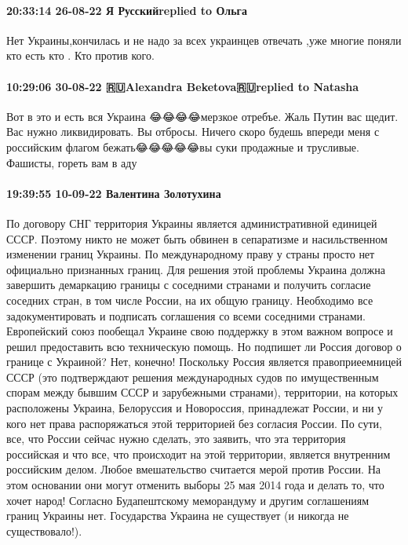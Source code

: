 \paragraph{20:33:14 26-08-22 Я Русскийreplied to Ольга}

Нет Украины,кончилась и не надо за всех украинцев отвечать ,уже многие поняли
кто есть кто . Кто против кого.

\paragraph{10:29:06 30-08-22 🇷🇺Alexandra Beketova🇷🇺replied to Natasha}

Вот в это и есть вся Украина 😂😂😂😂мерзкое отребъе. Жаль Путин вас щедит. Вас
нужно ликвидировать. Вы отбросы. Ничего скоро будешь впереди меня с российским
флагом бежать😂😂😂😂😂вы суки продажные и трусливые. Фашисты, гореть вам в аду


\paragraph{19:39:55 10-09-22 Валентина Золотухина}

По договору СНГ территория Украины является административной единицей СССР. Поэтому никто не может быть обвинен в сепаратизме и насильственном изменении границ Украины.
По международному праву у страны просто нет официально признанных границ.
Для решения этой проблемы Украина должна завершить демаркацию границы с соседними странами и получить согласие соседних стран, в том числе России, на их общую границу. Необходимо все задокументировать и подписать соглашения со всеми соседними странами.
Европейский союз пообещал Украине свою поддержку в этом важном вопросе и решил предоставить всю техническую помощь.
Но подпишет ли Россия договор о границе с Украиной? Нет, конечно!
Поскольку Россия является правоприеемницей СССР (это подтверждают решения международных судов по имущественным спорам между бывшим СССР и зарубежными странами), территории, на которых расположены Украина, Белоруссия и Новороссия, принадлежат России, и ни у кого нет права распоряжаться этой территорией без согласия России. По сути, все, что России сейчас нужно сделать, это заявить, что эта территория российская и что все, что происходит на этой территории, является внутренним российским делом.
Любое вмешательство считается мерой против России. На этом основании они могут отменить выборы 25 мая 2014 года и делать то, что хочет народ!
Согласно Будапештскому меморандуму и другим соглашениям границ Украины нет. Государства Украина не существует (и никогда не существовало!).


